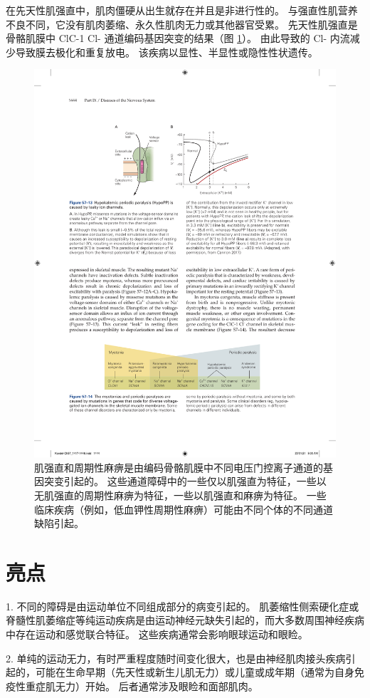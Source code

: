 在先天性肌强直中，肌肉僵硬从出生就存在并且是非进行性的。
与强直性肌营养不良不同，它没有肌肉萎缩、永久性肌肉无力或其他器官受累。
先天性肌强直是骨骼肌膜中 ClC-1 Cl- 通道编码基因突变的结果（图 \ref{fig:57_14}）。
由此导致的 Cl- 内流减少导致膜去极化和重复放电。
该疾病以显性、半显性或隐性性状遗传。


\begin{figure}[htbp]
	\centering
	\includegraphics[width=0.7\linewidth]{chap57/fig_57_14}
	\caption{肌强直和周期性麻痹是由编码骨骼肌膜中不同电压门控离子通道的基因突变引起的。 这些通道障碍中的一些仅以肌强直为特征，一些以无肌强直的周期性麻痹为特征，一些以肌强直和麻痹为特征。 一些临床疾病（例如，低血钾性周期性麻痹）可能由不同个体的不同通道缺陷引起。}
	\label{fig:57_14}
\end{figure}



\section{亮点}

1. 不同的障碍是由运动单位不同组成部分的病变引起的。
肌萎缩性侧索硬化症或脊髓性肌萎缩症等纯运动疾病是由运动神经元缺失引起的，而大多数周围神经疾病中存在运动和感觉联合特征。
这些疾病通常会影响眼球运动和眼睑。


2. 单纯的运动无力，有时严重程度随时间变化很大，也是由神经肌肉接头疾病引起的，可能在生命早期（先天性或新生儿肌无力）或儿童或成年期（通常为自身免疫性重症肌无力）开始。
后者通常涉及眼睑和面部肌肉。



